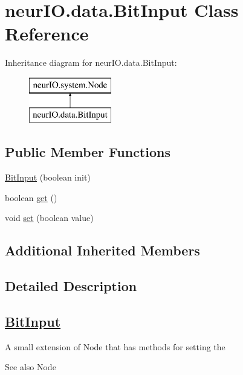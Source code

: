 \hypertarget{classneur_i_o_1_1data_1_1_bit_input}{}\section{neur\+I\+O.\+data.\+Bit\+Input Class Reference}
\label{classneur_i_o_1_1data_1_1_bit_input}
Inheritance diagram for neur\+I\+O.\+data.\+Bit\+Input\+:\begin{figure}[H]
\begin{center}
\leavevmode
\includegraphics[height=2.000000cm]{classneur_i_o_1_1data_1_1_bit_input}
\end{center}
\end{figure}
\subsection*{Public Member Functions}
\begin{DoxyCompactItemize}
\item 
\hyperlink{classneur_i_o_1_1data_1_1_bit_input_a8fd7c6ec8c91cac107c49d3a249b9881}{Bit\+Input} (boolean init)
\item 
boolean \hyperlink{classneur_i_o_1_1data_1_1_bit_input_a408162646fafda86ba4736c7ccc13458}{get} ()
\item 
void \hyperlink{classneur_i_o_1_1data_1_1_bit_input_ac1daaa68035a42bbc803ade1153861c5}{set} (boolean value)
\end{DoxyCompactItemize}
\subsection*{Additional Inherited Members}


\subsection{Detailed Description}
\subsection*{\hyperlink{classneur_i_o_1_1data_1_1_bit_input}{Bit\+Input} }

A small extension of Node that has methods for setting the \begin{DoxySeeAlso}{See also}
Node 
\end{DoxySeeAlso}



